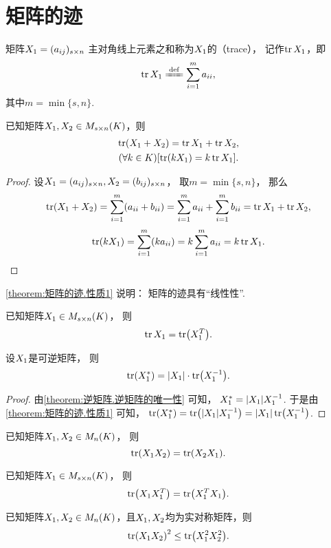 \section{矩阵的迹}
\begin{definition}
矩阵\(X_1=(a_{ij})_{s \times n}\)
主对角线上元素之和称为\(X_1\)的（trace），
记作\(\tr X_1\)，即\[
	\tr\A \defeq \sum_{i=1}^m a_{ii},
\]
其中\(m = \min\{s,n\}\).
\end{definition}

\begin{property}\label{theorem:矩阵的迹.性质1}
已知矩阵\(X_1,X_2 \in M_{s \times n}(K)\)，则
\begin{gather}
	\tr(X_1+X_2) = \tr X_1 + \tr X_2, \\
	(\forall k \in K)[\tr(k X_1) = k \tr X_1].
\end{gather}
\begin{proof}
设\(X_1=(a_{ij})_{s \times n},
X_2=(b_{ij})_{s \times n}\)，
取\(m = \min\{s,n\}\)，
那么\[
	\tr(X_1+X_2) = \sum_{i=1}^m (a_{ii}+b_{ii})
	= \sum_{i=1}^m a_{ii}
	+ \sum_{i=1}^m b_{ii}
	= \tr X_1 + \tr X_2,
\]\[
	\tr(k X_1) = \sum_{i=1}^m (k a_{ii})
	= k \sum_{i=1}^m a_{ii}
	= k \tr X_1.
	\qedhere
\]
\end{proof}
\end{property}
\cref{theorem:矩阵的迹.性质1} 说明：
矩阵的迹具有“线性性”.

\begin{property}\label{theorem:矩阵的迹.性质2}
已知矩阵\(X_1 \in M_{s \times n}(K)\)，
则\begin{equation}
	\tr X_1 = \tr(X_1^T).
\end{equation}
\end{property}

\begin{property}
设\(X_1\)是可逆矩阵，
则\begin{equation}
	\tr(X_1^*) = \abs{X_1} \cdot \tr(X_1^{-1}).
\end{equation}
\begin{proof}
由\cref{theorem:逆矩阵.逆矩阵的唯一性} 可知，
\(X_1^* = \abs{X_1} X_1^{-1}\).
于是由\cref{theorem:矩阵的迹.性质1} 可知，
\(\tr(X_1^*) = \tr(\abs{X_1} X_1^{-1}) = \abs{X_1} \tr(X_1^{-1})\).
\end{proof}
\end{property}

\begin{property}\label{theorem:矩阵的迹.矩阵乘积交换次序不变迹}
已知矩阵\(X_1,X_2 \in M_n(K)\)，
则\begin{equation}
	\tr(X_1X_2) = \tr(X_2X_1).
\end{equation}
\end{property}

\begin{property}
已知矩阵\(X_1 \in M_{s \times n}(K)\)，
则\begin{equation}
	\tr(X_1X_1^T) = \tr(X_1^TX_1).
\end{equation}
\end{property}

\begin{property}
已知矩阵\(X_1,X_2 \in M_n(K)\)，且\(X_1,X_2\)均为实对称矩阵，则\[
	\tr(X_1X_2)^2 \leq \tr(X_1^2X_2^2).
\]
\end{property}
